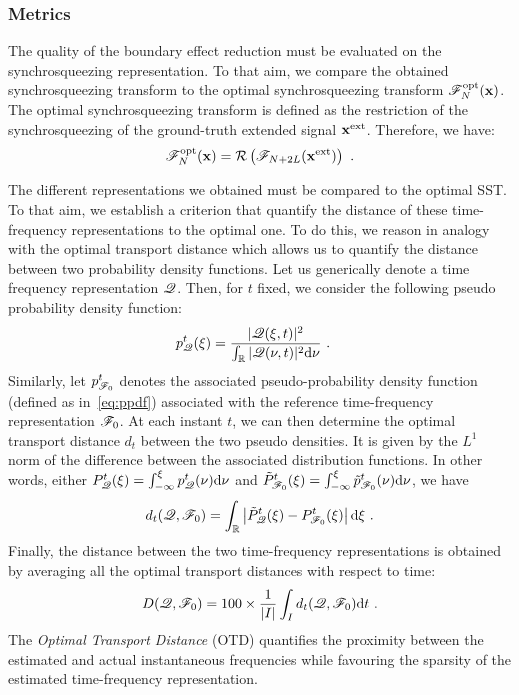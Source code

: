 \subsubsection{Metrics}
The quality of the boundary effect reduction must be evaluated on the synchrosqueezing representation. To that aim, we compare the obtained synchrosqueezing transform to the optimal synchrosqueezing transform ${\mathscr F}_N^\mathrm{opt}({\mathbf x})$. The optimal synchrosqueezing transform is defined as the restriction of the synchrosqueezing of the ground-truth extended signal ${\mathbf x}^\mathrm{ext}$. Therefore, we have:
\begin{equation*}
{\mathscr F}_N^\mathrm{opt}({\mathbf x}) = {\mathcal R}\left( {\mathscr F}_{N+2L}({\mathbf x}^\mathrm{ext}) \right) \ .
\end{equation*} 

The different representations we obtained must be compared to the optimal SST. To that aim, we establish a criterion that quantify the distance of these time-frequency representations to the optimal one. To do this, we reason in analogy with the optimal transport distance which allows us to quantify the distance between two probability density functions. Let us generically denote a time frequency representation ${\mathscr Q}$. Then, for $t$ fixed, we consider the following pseudo probability density function:
\begin{align}
p_{\mathscr Q}^t(\xi) &= \dfrac{|{\mathscr Q}(\xi,t)|^2}{\int_{\mathbb R} |{\mathscr Q}(\nu,t)|^2\mathrm{d}\nu}\ .
\label{eq:ppdf}
\end{align}
Similarly, let $p_{{\mathscr F}_0}^t$ denotes the associated pseudo-probability density function (defined as in~\eqref{eq:ppdf}) associated with the reference time-frequency representation ${\mathscr F}_0$. At each instant $t$, we can then determine the optimal transport distance $d_{t}$ between the two pseudo densities. It is given by the $L^1$ norm of the difference between the associated distribution functions. In other words, either $P_{{\mathscr Q}}^t(\xi)=\int_{-\infty}^\xi p_{{\mathscr Q}}^t(\nu)\mathrm{d}\nu$ and $\tilde P_{{\mathscr F}_0}^t(\xi)=\int_{-\infty}^\xi\tilde p_{{\mathscr F}_0}^t(\nu)\mathrm{d}\nu$, we have
\begin{equation*}
d_{t}({\mathscr Q},{\mathscr F}_0) = \int_{\mathbb R}\left|\tilde P_{{\mathscr Q}}^t(\xi)-  P_{{\mathscr F}_0}^t(\xi)\right|\mathrm{d}\xi\ .
\end{equation*}
Finally, the distance between the two time-frequency representations is obtained by averaging all the optimal transport distances with respect to time:
\begin{equation}
D({\mathscr Q},{\mathscr F}_0) = 100\times\frac1{|I|}\int_I d_{t}({\mathscr Q},{\mathscr F}_0)\mathrm{d}t\ .
\end{equation}
The \textit{Optimal Transport Distance} (OTD) quantifies the proximity between the estimated and actual instantaneous frequencies while favouring the sparsity of the estimated time-frequency representation.

